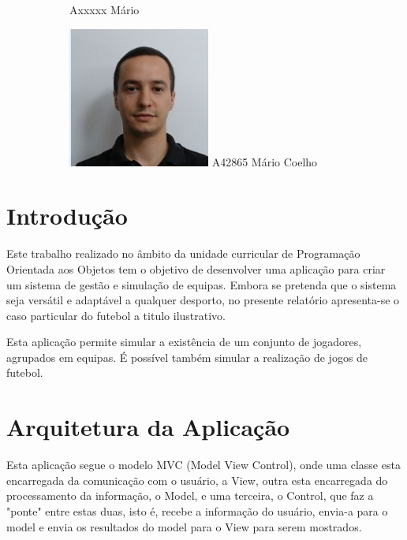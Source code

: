 \documentclass[11pt]{article}
\begin{document}
\begin{figure}[h!]
\begin{subfigure}[h!]{0.3\linewidth}
		Axxxxx Mário
	\end{subfigure}%
	\begin{subfigure}[h!]{0.3\linewidth}
		\centering
		\includegraphics[width=\linewidth]{MC.jpeg}
		A42865 Mário Coelho
	\end{subfigure}
\end{figure}


\section{Introdução}
Este trabalho realizado no âmbito da unidade curricular de Programação Orientada aos Objetos tem o objetivo de desenvolver uma aplicação para criar um sistema de gestão e simulação de equipas. Embora se pretenda que o sistema seja versátil e adaptável a qualquer desporto, no presente relatório apresenta-se o caso particular do futebol a titulo ilustrativo.

Esta aplicação permite simular a existência de um conjunto de jogadores, agrupados em equipas. É possível também simular a realização de jogos de futebol.

\section{Arquitetura da Aplicação}
Esta aplicação segue o modelo MVC (Model View Control), onde uma classe esta encarregada da comunicação com o usuário, a View, outra esta encarregada do processamento da informação, o Model, e uma terceira, o Control, que faz a "ponte" entre estas duas, isto é, recebe a informação do usuário, envia-a para o model e envia os resultados do model para o View para serem mostrados.
\end{document}
